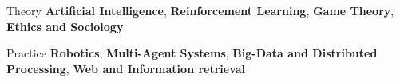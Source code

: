 \begin{cvinterests}

  \cvskill
    {Theory}
    {\textbf{Artificial Intelligence}, \textbf{Reinforcement Learning}, \textbf{Game Theory}, \textbf{Ethics and Sociology}} %

  \cvskill
    {Practice} %
    {\textbf{Robotics}, \textbf{Multi-Agent Systems}, \textbf{Big-Data and Distributed Processing}, \textbf{Web and Information retrieval}} %

\end{cvinterests}
